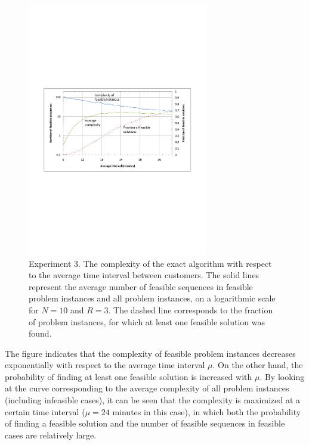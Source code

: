 \documentclass[dissertation,draft*]{aaltoseries}
\begin{document}
\begin{figure}[ht]
\begin{center}
\includegraphics[width=0.7\textwidth]{intvertailu01.pdf}
\caption{Experiment 3. The complexity of the exact algorithm with respect to the average time 
interval between customers. The solid lines represent the average number of feasible sequences in
feasible problem instances and all problem instances, on a logarithmic scale for $N=10$ and $R=3$.
The dashed line corresponds to the fraction
of problem instances, for which at least one feasible solution was found.}
\label{intvertailu01}
\end{center}
\end{figure}

The figure indicates that the complexity of feasible problem instances decreases exponentially 
with respect to the average time interval $\mu$. On the other hand, the probability of finding
at least one feasible solution is increased with $\mu$. By looking at the curve corresponding 
to the average complexity of all problem instances (including infeasible cases), it can be seen that the
complexity is maximized at a certain time interval ($\mu = 24$ minutes in this case), in which both the probability of
finding a feasible solution and the number of feasible sequences in feasible cases are relatively large.
\end{document}
